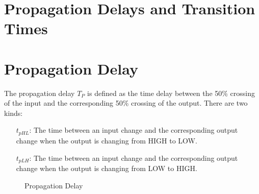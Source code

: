 \section{Propagation Delays and Transition Times}

\section{Propagation Delay}

The propagation delay $T_P$ is defined as the time delay between 
the 50\% crossing of the input and the corresponding 50\% 
crossing of the output. There are two kinds:

\begin{itemize}
    \item[$t_{pHL}$:] The time between an input change and the corresponding output change
    when the output is changing from HIGH to LOW.
    \item[$t_{pLH}$:] The time between an input change and the corresponding output change
    when the output is changing from LOW to HIGH.
\end{itemize}

\begin{figure}
    \caption{Propagation Delay}
    \label{fig:propagationdelay}
\end{figure}

